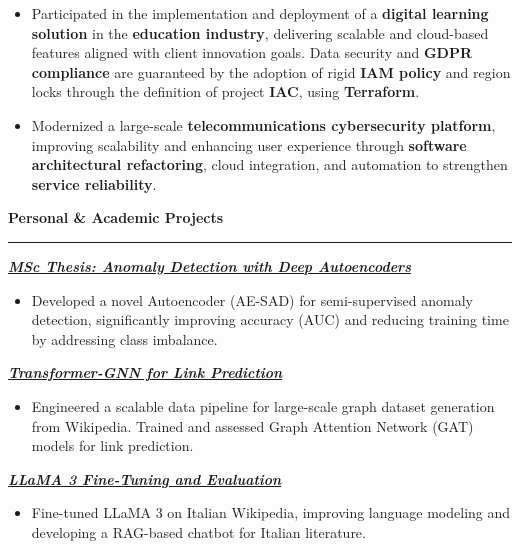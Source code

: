 \documentclass[9pt, a4paper]{article}
\newcommand{\cvsection}[1]{%
	\vspace{2pt}\par
	{\Large\bfseries\color{sectionblue}#1}\par
	\vspace{2pt}\hrule\vspace{6pt}
}
\newcommand{\cvproject}[1]{%
	\par {{\bfseries{\textit{#1}}}} \par \vspace{4pt}
}
\begin{document}
\begin{minipage}[t]{0.65\linewidth}
\begin{itemize}[leftmargin=*, nosep]
			\vspace{5pt}
			\item \footnotesize Participated in the implementation and deployment of a \textbf{digital learning solution} in the \textbf{education industry}, delivering scalable and cloud-based features aligned with client innovation goals. Data security and \textbf{GDPR compliance} are guaranteed by the adoption of rigid \textbf{IAM policy} and region locks through the definition of project \textbf{IAC}, using \textbf{Terraform}. 
			
			\vspace{5pt}
			\item \footnotesize Modernized a large-scale \textbf{telecommunications cybersecurity platform}, improving scalability and enhancing user experience through \textbf{software architectural refactoring}, cloud integration, and automation to strengthen \textbf{service reliability}. 
		\end{itemize}
		
		\vspace{10pt}\par
		\cvsection{Personal \& Academic Projects}
		
		\cvproject{\href{https://github.com/bGuzzo/msc-ai-ml-thesis-anomaly-detection}{MSc Thesis: Anomaly Detection with Deep Autoencoders}}
		\begin{itemize}[leftmargin=*, nosep]
			\item \footnotesize Developed a novel Autoencoder (AE-SAD) for semi-supervised anomaly detection, significantly improving accuracy (AUC) and reducing training time by addressing class imbalance.
		\end{itemize}
		
		\vspace{5pt}
		\cvproject{\href{https://github.com/bGuzzo/transformer-gnn-link-prediction}{Transformer-GNN for Link Prediction}}
		\begin{itemize}[leftmargin=*, nosep]
			\item \footnotesize Engineered a scalable data pipeline for large-scale graph dataset generation from Wikipedia. Trained and assessed Graph Attention Network (GAT) models for link prediction.
		\end{itemize}
		
		\vspace{5pt}
		\cvproject{\href{https://github.com/bGuzzo/Italian-LLaMA-Project}{LLaMA 3 Fine-Tuning and Evaluation}}
		\begin{itemize}[leftmargin=*, nosep]
			\item \footnotesize Fine-tuned LLaMA 3 on Italian Wikipedia, improving language modeling and developing a RAG-based chatbot for Italian literature.
		\end{itemize}
		

\end{minipage}
\end{document}
